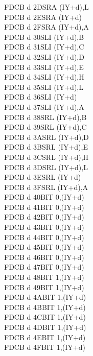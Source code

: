 \begin{multicols}{3}
{\begin{tabbing}
    FDCB d 2D\>SRA (IY+d),L\UNDOC\\
    FDCB d 2E\>SRA (IY+d)\\
    FDCB d 2F\>SRA (IY+d),A\UNDOC\\
    FDCB d 30\>SLI (IY+d),B\UNDOC\\
    FDCB d 31\>SLI (IY+d),C\UNDOC\\
    FDCB d 32\>SLI (IY+d),D\UNDOC\\
    FDCB d 33\>SLI (IY+d),E\UNDOC\\
    FDCB d 34\>SLI (IY+d),H\UNDOC\\
    FDCB d 35\>SLI (IY+d),L\UNDOC\\
    FDCB d 36\>SLI (IY+d)\UNDOC\\
    FDCB d 37\>SLI (IY+d),A\UNDOC\\
    FDCB d 38\>SRL (IY+d),B\UNDOC\\
    FDCB d 39\>SRL (IY+d),C\UNDOC\\
    FDCB d 3A\>SRL (IY+d),D\UNDOC\\
    FDCB d 3B\>SRL (IY+d),E\UNDOC\\
    FDCB d 3C\>SRL (IY+d),H\UNDOC\\
    FDCB d 3D\>SRL (IY+d),L\UNDOC\\
    FDCB d 3E\>SRL (IY+d)\\
    FDCB d 3F\>SRL (IY+d),A\UNDOC\\
    FDCB d 40\>BIT 0,(IY+d)\UNDOC\\
    FDCB d 41\>BIT 0,(IY+d)\UNDOC\\
    FDCB d 42\>BIT 0,(IY+d)\UNDOC\\
    FDCB d 43\>BIT 0,(IY+d)\UNDOC\\
    FDCB d 44\>BIT 0,(IY+d)\UNDOC\\
    FDCB d 45\>BIT 0,(IY+d)\UNDOC\\
    FDCB d 46\>BIT 0,(IY+d)\\
    FDCB d 47\>BIT 0,(IY+d)\UNDOC\\
    FDCB d 48\>BIT 1,(IY+d)\UNDOC\\
    FDCB d 49\>BIT 1,(IY+d)\UNDOC\\
    FDCB d 4A\>BIT 1,(IY+d)\UNDOC\\
    FDCB d 4B\>BIT 1,(IY+d)\UNDOC\\
    FDCB d 4C\>BIT 1,(IY+d)\UNDOC\\
    FDCB d 4D\>BIT 1,(IY+d)\UNDOC\\
    FDCB d 4E\>BIT 1,(IY+d)\\
    FDCB d 4F\>BIT 1,(IY+d)\UNDOC\\

\end{tabbing}}
\end{multicols}
